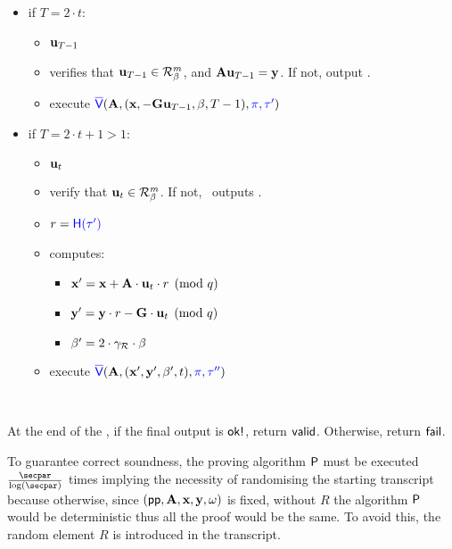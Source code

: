 \begin{itemize}
\begin{itemize}
			\item if $T = 2 \cdot t$:
			\begin{itemize}
				\item {}  $\vu[T-1]$ 
				\item {} verifies that $\vu[T-1] \in \Rring[\beta]^{m}$,
					and $\vA \vu[T-1] = \vy$.
					If not, output \bad.
				\item {} execute
					$\blue{\verifyR}(\vA,(\vx,- \vG \vu[T-1],\beta,T-1), 
						\blue{\proof,\transcript^\prime}  )$
			\end{itemize}
			
			\item if $T = 2 \cdot t + 1 > 1$:
			\begin{itemize}
				\item {}  $\vu[t]$ 
				\item verify that $\vu[t] \in \Rring[\beta]^{m}$.
					If not, \advV\ outputs \bad.
				\item {} $r = \blue{\hashf{\transcript^\prime}}$ 
				\item {} computes:
					\begin{itemize}
						\item $\vx^\prime = \vx+\vA\cdot\vu[t]\cdot r \pmod{q}$
						\item $\vy^\prime = \vy\cdot r - \vG\cdot\vu[t] \pmod{q}$
						\item $\beta^\prime = 2 \cdot \gammaR \cdot \beta$
					\end{itemize}
				\item {} execute
					$\blue{\verifyR}(\vA,(\vx^\prime,\vy^\prime,\beta^\prime,t),
						\blue{\proof,\transcript^{\prime\prime}} )$
			\end{itemize}\
		\end{itemize}
		At the end of the , if the final output is $\textsf{ok!}$, return $\textsf{valid}$.
		Otherwise, return $\textsf{fail}$.
	
\end{itemize}

To guarantee correct soundness, the proving algorithm $\textsf{P}$ must be executed
$\frac{\secpar}{\log(\secpar)}$ times implying the necessity of randomising the starting transcript
because otherwise, since $(\pp,\vA,\vx,\vy,\witness)$ is fixed, without $R$
the algorithm $\textsf{P}$ would be deterministic thus all the proof would be the same.
%
To avoid this, the random element $R$ is introduced in the transcript.



